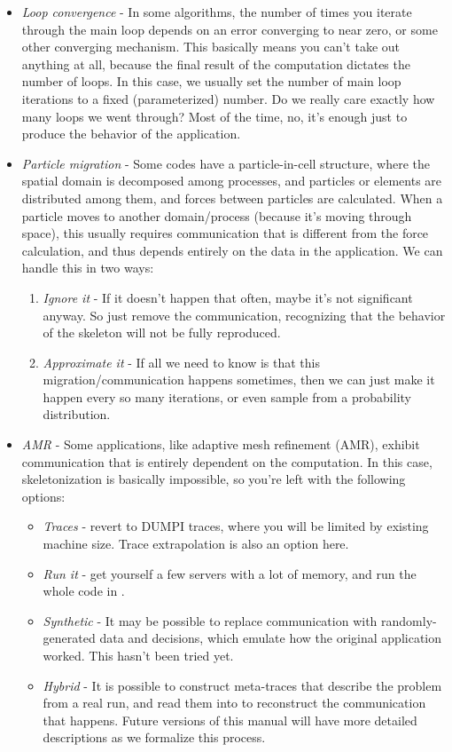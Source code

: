 \begin{itemize}
\item \textit{Loop convergence} - In some algorithms, the number of times you iterate through the main loop depends on an error converging to near zero, or some other converging mechanism.  This basically means you can't take out anything at all, because the final result of the computation dictates the number of loops.  In this case, we usually set the number of main loop iterations to a fixed (parameterized) number.  Do we really care exactly how many loops we went through?  Most of the time, no, it's enough just to produce the behavior of the application.  
\item \textit{Particle migration} - Some codes have a particle-in-cell structure, where the spatial domain is decomposed among processes, and particles or elements are distributed among them, and forces between particles are calculated.  When a particle moves to another domain/process (because it's moving through space), this usually requires communication that is different from the force calculation, and thus depends entirely on the data in the application.  We can handle this in two ways:
\begin{enumerate}
\item \textit{Ignore it} - If it doesn't happen that often, maybe it's not significant anyway.  So just remove the communication, recognizing that the behavior of the skeleton will not be fully reproduced.
\item \textit{Approximate it} - If all we need to know is that this migration/communication happens sometimes, then we can just make it happen every so many iterations, or even sample from a probability distribution.  
\end{enumerate}
\item \textit{AMR} - Some applications, like adaptive mesh refinement (AMR), exhibit communication that is entirely dependent on the computation.  In this case, skeletonization is basically impossible, so you're left with the following options:
\begin{itemize}
\item \textit{Traces}  - revert to DUMPI traces, where you will be limited by existing machine size.  Trace extrapolation is also an option here.
\item \textit{Run it} - get yourself a few servers with a lot of memory, and run the whole code in \sstmacro.
\item \textit{Synthetic} - It may be possible to replace communication with randomly-generated data and decisions, which emulate how the original application worked. This hasn't been tried yet.
\item \textit{Hybrid} - It is possible to construct meta-traces that describe the problem from a real run, and read them into \sstmacro to reconstruct the communication that happens.  Future versions of this manual will have more detailed descriptions as we formalize this process.
\end{itemize}
\end{itemize}

